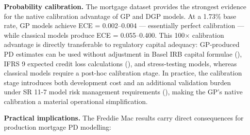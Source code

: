 \documentclass[
  letterpaper,
  DIV=11,
  numbers=noendperiod]{scrartcl}
\begin{document}
\textbf{Probability calibration.} The mortgage dataset provides the
strongest evidence for the native calibration advantage of GP and DGP
models. At a 1.73\% base rate, GP models achieve ECE = 0.002--0.004 ---
essentially perfect calibration --- while classical models produce ECE =
0.055--0.400. This 100\(\times\) calibration advantage is directly
transferable to regulatory capital adequacy: GP-produced PD estimates
can be used without adjustment in Basel IRB capital formulae
(), IFRS 9 expected credit loss calculations
(), and stress-testing models, whereas classical models require a
post-hoc calibration stage. In practice, the calibration stage
introduces both development cost and an additional validation burden
under SR 11-7 model risk management requirements
(), making the GP's native calibration a material
operational simplification.

\textbf{Practical implications.} The Freddie Mac results carry direct
consequences for production mortgage PD modelling:
\end{document}
